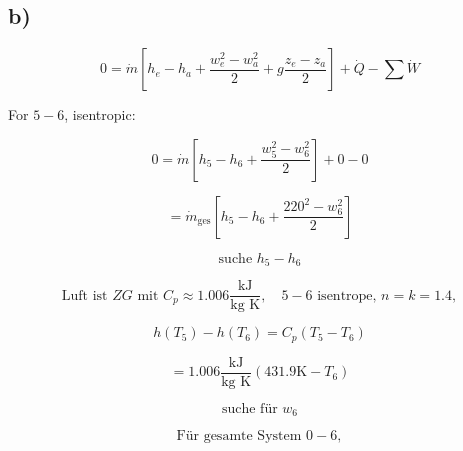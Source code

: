 

\subsection*{b)}

\[
0 = \dot{m} \left[ h_e - h_a + \frac{w_e^2 - w_a^2}{2} + g \frac{z_e - z_a}{2} \right] + \dot{Q} - \sum \dot{W}
\]

For $5-6$, isentropic:

\[
0 = \dot{m} \left[ h_5 - h_6 + \frac{w_5^2 - w_6^2}{2} \right] + 0 - 0
\]

\[
= \dot{m}_{\text{ges}} \left[ h_5 - h_6 + \frac{220^2 - w_6^2}{2} \right]
\]

\[
\text{suche } h_5 - h_6
\]

\[
\text{Luft ist } ZG \text{ mit } C_p \approx 1.006 \frac{\text{kJ}}{\text{kg K}}, \quad 5-6 \text{ isentrope, } n = k = 1.4,
\]

\[
h(T_5) - h(T_6) = C_p (T_5 - T_6)
\]

\[
= 1.006 \frac{\text{kJ}}{\text{kg K}} (431.9 \text{K} - T_6)
\]

\[
\text{suche für } w_6
\]

\[
\text{Für gesamte System } 0-6,
\]

